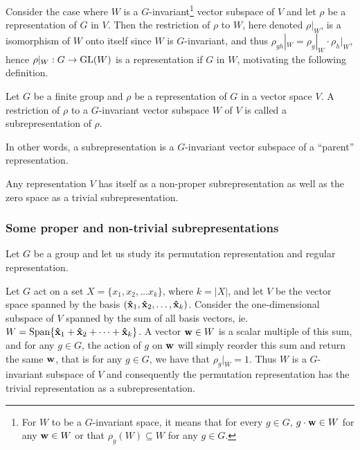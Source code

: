 Consider the case where $W$ is a $G$-invariant\footnote{For $W$ to be a $G$-invariant space, it means that for every $g \in G$, $g \cdot \mathbf{w} \in W$ for any $\mathbf{w} \in W$ or that $\rho_g(W) \subseteq W$ for any $g\in G$.} vector subspace of $V$%
and let $\rho$ be a representation of $G$ in $V$. Then the restriction of $\rho$ to $W$, here denoted $\rho|_W$, is a isomorphism of $W$ onto itself since $W$ is $G$-invariant,
and thus $\rho_{gh}|_W = \rho_g|_W \cdot \rho_h|_W$, hence $\rho|_W: G \rightarrow \text{GL}(W)$ is a representation if $G$ in $W$, motivating the following definition.

\begin{definition}[Subrepresentation]\label{def:subrepr}
	Let $G$ be a finite group and $\rho$ be a representation of $G$ in a vector space $V$. A restriction of $\rho$ to a $G$-invariant vector subspace $W$ of $V$ is called a subrepresentation of $\rho$.
\end{definition}

In other words, a subrepresentation is a $G$-invariant vector subspace of a ``parent'' representation. 

\begin{example}
	Any representation $V$ has itself as a non-proper subrepresentation as well as the zero space as a trivial subrepresentation.
\end{example}

\subsubsection{Some proper and non-trivial subrepresentations}

Let $G$ be a group and let us study its permutation representation and regular representation. 

\begin{example}\cite[Example 1.4.3.]{Sagan}\label{example:trivpermrepr}
	Let $G$ act on a set $X = \{x_1, x_2, \dots x_k\}$, where $k = |X|$, and let $V$ be the vector space spanned by the basis $(\mathbf{\hat{x}}_1, \mathbf{\hat{x}}_2, \dots, \mathbf{\hat{x}}_k)$. Consider the one-dimensional subspace of $V$ spanned by the sum of all basis vectors, ie. $W = \text{Span}\{ \mathbf{\hat{x}}_1 + \mathbf{\hat{x}}_2 + \dots + \mathbf{\hat{x}}_k \}$. A vector $\mathbf{w} \in W$ is a scalar multiple of this sum, and for any $g \in G$, the action of $g$ on $\mathbf{w}$ will simply reorder this sum and return the same $\mathbf{w}$, that is for any $g \in G$, we have that $\rho_g|_W = 1$. Thus $W$ is a $G$-invariant subspace of $V$ and consequently the permutation representation has the trivial representation as a subrepresentation.
\end{example}

